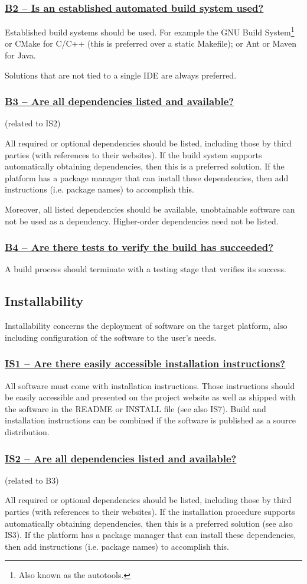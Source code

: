 \documentclass[a4paper,11pt]{article}
\newcommand{\indicator}[1]{\subsubsection*{\underline{#1}}}
\begin{document}
\indicator{B2 -- Is an established automated build system used?}

Established build systems should be used. For example the GNU Build
System\footnote{Also known as the autotools.} or CMake for C/C++ (this is
preferred over a static Makefile); or Ant or Maven for Java. 

Solutions that are not tied to a single IDE are always preferred.

\indicator{B3 -- Are all dependencies listed and available?}
(related to IS2)

All required or optional dependencies should be listed, including those by
third parties (with references to their websites). If the build system supports
automatically obtaining dependencies, then this is a preferred solution. If the
platform has a package manager that can install these dependencies, then add
instructions (i.e. package names) to accomplish this.

Moreover, all listed dependencies should be available, unobtainable software
can not be used as a dependency. Higher-order dependencies need not be listed.

\indicator{B4 -- Are there tests to verify the build has succeeded?}

A build process should terminate with a testing stage that verifies its success.

\subsection{Installability}

Installability concerns the deployment of software on the target platform, also
including configuration of the software to the user's needs.

\indicator{IS1 -- Are there easily accessible installation instructions?}

All software must come with installation instructions. Those instructions should
be easily accessible and presented on the project website as well as shipped
with the software in the README or INSTALL file (see also IS7). Build and installation
instructions can be combined if the software is published as a source
distribution.

\indicator{IS2 -- Are all dependencies listed and available?}
(related to B3)

All required or optional dependencies should be listed, including those by
third parties (with references to their websites). If the installation
procedure supports automatically obtaining dependencies, then this is a
preferred solution (see also IS3). If the platform has a package manager that
can install these dependencies, then add instructions (i.e. package names) to
accomplish this.
\end{document}
